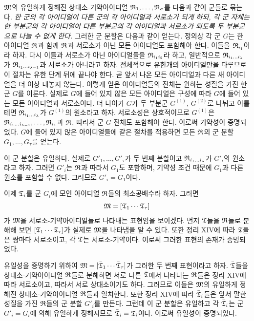 $\mathfrak{M}$의 유일하게 정해진 상대소-기약아이디얼 $\mathfrak{R}_1,\ldots,\mathfrak{R}_\sigma$를 다음과 같이 군들로 묶는다. \emph{한 군의 각 아이디얼이 다른 군의 각 아이디얼과 서로소가 되게 하되, 각 군 자체는 한 부분군의 각 아이디얼이 다른 부분군의 각 아이디얼과 서로소가 되도록 두 부분군으로 나눌 수 없게 한다.} 그러한 군 분할은 다음과 같이 얻는다. 정의상 각 군 $G$는 한 아이디얼 $\mathfrak{R}$과 함께 $\mathfrak{R}$과 서로소가 아닌 모든 아이디얼도 포함해야 한다. 이들을 $\mathfrak{R}_{i_1}$이라 하자. 다시 이들과 서로소가 아닌 아이디얼들을 $\mathfrak{R}_{i_1i_2}$라 하고, 일반적으로 $\mathfrak{R}_{i_1\ldots i_\lambda}$가 $\mathfrak{R}_{i_1\ldots i_{\lambda-1}}$과 서로소가 아니라고 하자. 전체적으로 유한개의 아이디얼만을 다루므로 이 절차는 유한 단계 뒤에 끝나야 한다. 곧 앞서 나온 모든 아이디얼과 다른 새 아이디얼을 더 이상 내놓지 않는다. 이렇게 얻은 아이디얼들의 전체는 원하는 성질을 가진 한 군 $G$를 이룬다. 실제로 $G$에 들어 있지 않은 모든 아이디얼은 구성에 따라 $G$에 들어 있는 모든 아이디얼과 서로소이다. 더 나아가 $G$가 두 부분군 $G^{(1)}$, $G^{(2)}$로 나뉘고 이를테면 $\mathfrak{R}_{i_1\ldots i_\lambda}$가 $G^{(1)}$의 원소라고 하자. 서로소성은 상호적이므로 $G^{(1)}$은 $\mathfrak{R}_{i_1\ldots i_{\lambda-1}},\ldots,\mathfrak{R}_{i_1}$과 $\mathfrak{R}$, 따라서 군 $G$ 전체도 포함해야 한다. 이로써 기약성이 증명되었다. $G$에 들어 있지 않은 아이디얼들에 같은 절차를 적용하면 모든 $\mathfrak{R}$의 군 분할 $G_1,\ldots,G_\tau$를 얻는다.

이 군 분할은 유일하다. 실제로 $G'_1,\ldots,G'_\tau$가 두 번째 분할이고 $\mathfrak{R}_{i_1\ldots i_\lambda}$가 $G'_i$의 원소라고 하자. 그러면 $G'_i$는 $\mathfrak{R}$과 따라서 $G_1$도 포함하며, 기약성 조건 때문에 $G_1$과 다른 원소를 포함할 수 없다. 그러므로 $G'_i=G_1$이다.

이제 $\mathfrak{T}_i$를 군 $G_i$에 모인 아이디얼 $\mathfrak{R}$들의 최소공배수라 하자. 그러면
\[
 \mathfrak{M}=[\mathfrak{T}_1\cdots\mathfrak{T}_\tau]
\]
가 $\mathfrak{M}$을 서로소-기약아이디얼들로 나타내는 표현임을 보이겠다. 먼저 $\mathfrak{T}$들을 $\mathfrak{R}$들로 분해해 보면 $[\mathfrak{T}_1\cdots\mathfrak{T}_\tau]$가 실제로 $\mathfrak{M}$을 나타냄을 알 수 있다. 또한 정리 XIV에 따라 $\mathfrak{T}$들은 쌍마다 서로소이고, 각 $\mathfrak{T}$는 서로소-기약이다. 이로써 그러한 표현의 존재가 증명되었다.

유일성을 증명하기 위하여 $\mathfrak{M}=[\bar{\mathfrak{T}}_1\cdots\bar{\mathfrak{T}}_\tau]$가 그러한 두 번째 표현이라고 하자. $\bar{\mathfrak{T}}$들을 상대소-기약아이디얼 $\mathfrak{R}$들로 분해하면 서로 다른 $\bar{\mathfrak{T}}$에서 나타나는 $\mathfrak{R}$들은 정리 XIV에 따라 서로소이고, 따라서 서로 상대소이기도 하다. 그러므로 이들은 $\mathfrak{M}$의 유일하게 정해진 상대소-기약아이디얼 $\mathfrak{R}$들과 일치한다. 또한 정리 XIV에 따라 $\bar{\mathfrak{T}}_i$들은 앞서 말한 성질을 가진 $\mathfrak{R}$들의 군 분할 $G'_i$를 만든다. 그런데 이 군 분할은 유일하고 각 $\bar{\mathfrak{T}}_i$는 군 $G'_i=G_i$에 의해 유일하게 정해지므로 $\bar{\mathfrak{T}}_i=\mathfrak{T}_i$이다. 이로써 유일성이 증명되었다.

